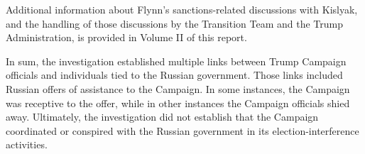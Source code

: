 Additional information about Flynn's sanctions-related discussions with Kislyak, and the handling of those discussions by the Transition Team and the Trump Administration, is provided in Volume II of this report.

\hr

In sum, the investigation established multiple links between Trump Campaign officials and individuals tied to the Russian government.
Those links included Russian offers of assistance to the Campaign.
In some instances, the Campaign was receptive to the offer, while in other instances the Campaign officials shied away.
Ultimately, the investigation did not establish that the Campaign coordinated or conspired with the Russian government in its election-interference activities.
